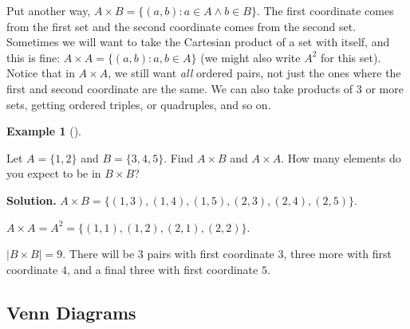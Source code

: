 \documentclass[10pt,]{book}
\theoremstyle{plain}
\theoremstyle{definition}
\newtheorem{example}[theorem]{Example}
\theoremstyle{definition}
\theoremstyle{definition}
\numberwithin{equation}{chapter}
\def\st{:}
\begin{document}
      Put another way, \(A \times B = \{(a,b) \st a \in A \wedge b \in B\}\). The first coordinate comes from the first set and the second coordinate comes from the second set. Sometimes we will want to take the Cartesian product of a set with itself, and this is fine: \(A \times A = \{(a,b) \st a, b \in A\}\) (we might also write \(A^2\) for this set). Notice that in \(A \times A\), we still want \emph{all} ordered pairs, not just the ones where the first and second coordinate are the same. We can also take products of 3 or more sets, getting ordered triples, or quadruples, and so on.
\begin{example}[]\label{example-15}

          Let \(A = \{1,2\}\) and \(B = \{3,4,5\}\). Find \(A \times B\) and \(A \times A\). How many elements do you expect to be in \(B \times B\)?
\par\medskip\noindent%
\textbf{Solution.}\quad
          \(A \times B = \{(1,3), (1,4), (1,5), (2,3), (2,4), (2,5)\}\).
\par

          \(A \times A = A^2 = \{(1,1), (1,2), (2,1), (2,2)\}\).
\par

          \(|B\times B| = 9\). There will be 3 pairs with first coordinate \(3\), three more with first coordinate \(4\), and a final three with first coordinate \(5\).
\end{example}
\typeout{************************************************}
\typeout{************************************************}
\subsection[Venn Diagrams]{Venn Diagrams}\label{subsection-7}
\end{document}
